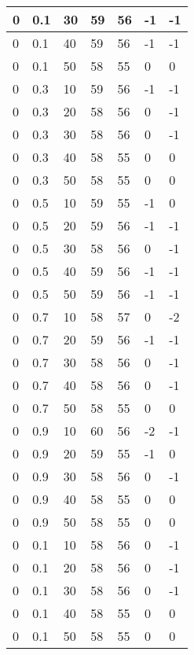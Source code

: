 \begin{longtable}{|l|l|l|l|l|l|l|}
		0     & 0.1 & 30   & 59 & 56 & -1  & -1  \\ \hline
		0     & 0.1 & 40   & 59 & 56 & -1  & -1  \\ \hline
		0     & 0.1 & 50   & 58 & 55 & 0   & 0   \\ \hline
		0     & 0.3 & 10   & 59 & 56 & -1  & -1  \\ \hline
		0     & 0.3 & 20   & 58 & 56 & 0   & -1  \\ \hline
		0     & 0.3 & 30   & 58 & 56 & 0   & -1  \\ \hline
		0     & 0.3 & 40   & 58 & 55 & 0   & 0   \\ \hline
		0     & 0.3 & 50   & 58 & 55 & 0   & 0   \\ \hline
		0     & 0.5 & 10   & 59 & 55 & -1  & 0   \\ \hline
		0     & 0.5 & 20   & 59 & 56 & -1  & -1  \\ \hline
		0     & 0.5 & 30   & 58 & 56 & 0   & -1  \\ \hline
		0     & 0.5 & 40   & 59 & 56 & -1  & -1  \\ \hline
		0     & 0.5 & 50   & 59 & 56 & -1  & -1  \\ \hline
		0     & 0.7 & 10   & 58 & 57 & 0   & -2  \\ \hline
		0     & 0.7 & 20   & 59 & 56 & -1  & -1  \\ \hline
		0     & 0.7 & 30   & 58 & 56 & 0   & -1  \\ \hline
		0     & 0.7 & 40   & 58 & 56 & 0   & -1  \\ \hline
		0     & 0.7 & 50   & 58 & 55 & 0   & 0   \\ \hline
		0     & 0.9 & 10   & 60 & 56 & -2  & -1  \\ \hline
		0     & 0.9 & 20   & 59 & 55 & -1  & 0   \\ \hline
		0     & 0.9 & 30   & 58 & 56 & 0   & -1  \\ \hline
		0     & 0.9 & 40   & 58 & 55 & 0   & 0   \\ \hline
		0     & 0.9 & 50   & 58 & 55 & 0   & 0   \\ \hline
		0     & 0.1 & 10   & 58 & 56 & 0   & -1  \\ \hline
		0     & 0.1 & 20   & 58 & 56 & 0   & -1  \\ \hline
		0     & 0.1 & 30   & 58 & 56 & 0   & -1  \\ \hline
		0     & 0.1 & 40   & 58 & 55 & 0   & 0   \\ \hline
		0     & 0.1 & 50   & 58 & 55 & 0   & 0   \\ \hline

\end{longtable}
